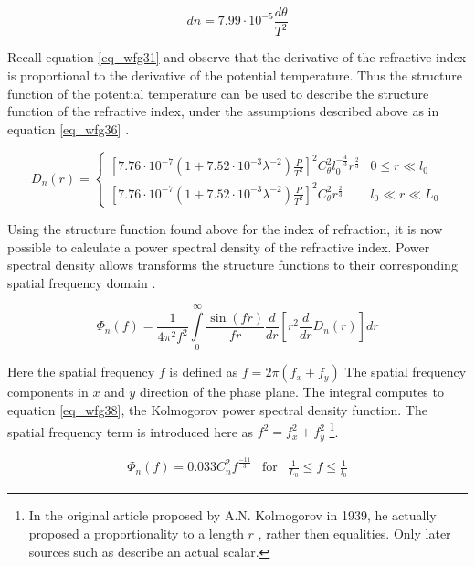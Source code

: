 \documentclass{article}
\begin{document}
\begin{equation}
dn = 7.99 \cdot 10^{-5} \frac{d\theta}{T^2}
\label{eq_wfg35}
\end{equation}

Recall equation \ref{eq_wfg31} and observe that the derivative of the  refractive index is proportional to the derivative of the potential temperature. Thus the structure function of the potential temperature can be used to describe the structure function of the refractive index, under the assumptions described above as in equation \ref{eq_wfg36} \cite{zernikeMatlab}.

\begin{equation}
D_n(r) = 
\begin{cases}
\left[7.76 \cdot 10^{-7} \left(1 + 7.52 \cdot 10^{-3} \lambda^{-2} \right) \frac{P}{T^2} \right]^2 C_\theta^2 l_0^{-\frac{4}{3}} r^{\frac{2}{3}} & 0 \leq r \ll l_0\\
\left[7.76 \cdot 10^{-7} \left(1 + 7.52 \cdot 10^{-3} \lambda^{-2} \right) \frac{P}{T^2} \right]^2 C_\theta^2 r^{\frac{2}{3}} & l_0 \ll r \ll L_0 
\end{cases}
\label{eq_wfg36}
\end{equation}

Using the structure function found above for the index of refraction, it is now possible to calculate a power spectral density of the refractive index. Power spectral density allows transforms the structure functions to their corresponding spatial frequency domain \cite{zernikeMatlab}.

\begin{equation}
\Phi_n(f) = \frac{1}{4 \pi^2 f^2} \int \limits_0^\infty \frac{\sin(f r)}{f r} \frac{d}{dr} \left[ r^2 \frac{d}{dr} D_n(r) \right] dr
\label{eq_wfg37}
\end{equation}

Here the spatial frequency $f$ is defined as $f = 2 \pi (f_x + f_y)$ The spatial frequency components in $x$ and $y$ direction of the phase plane. The integral computes to equation \ref{eq_wfg38}, the Kolmogorov power spectral density function. The spatial frequency term is introduced here as $f^2 =f_x^2 + f_y^2$ \cite{zernikeMatlab} \cite{lectureNotes} \footnote{In the original article proposed by A.N. Kolmogorov in 1939, he actually proposed a proportionality to a length $r$ \cite{kolmogorov1941local}, rather then equalities. Only later sources such as \cite{zernikeMatlab} describe an actual scalar.}.

\begin{equation}
\begin{matrix}
\Phi_n(f) = 0.033 C_n^2 f^{\frac{-11}{3}} & \text{for} & \frac{1}{L_0} \leq f \leq \frac{1}{l_0}
\end{matrix}
\label{eq_wfg38}
\end{equation}
\end{document}
